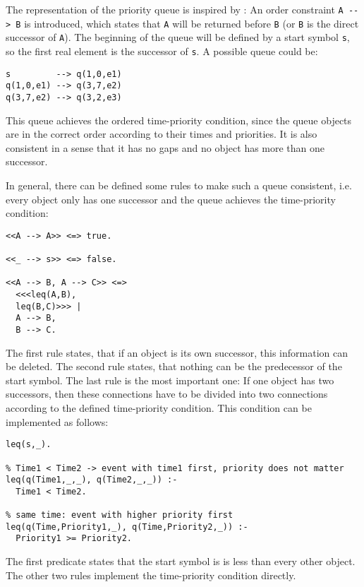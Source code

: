 The representation of the priority queue is inspired by \cite[38\psqq]{fru_chr_book_2009}: An order constraint \verb|A --> B| is introduced, which states that \verb|A| will be returned before \verb|B| (or \verb|B| is the direct successor of \verb|A|). The beginning of the queue will be defined by a start symbol \verb|s|, so the first real element is the successor of \verb|s|. A possible queue could be:

\begin{lstlisting}
s         --> q(1,0,e1)
q(1,0,e1) --> q(3,7,e2)
q(3,7,e2) --> q(3,2,e3)
\end{lstlisting}

This queue achieves the ordered time-priority condition, since the queue objects are in the correct order according to their times and priorities. It is also consistent in a sense that it has no gaps and no object has more than one successor.

In general, there can be defined some rules to make such a queue consistent, i.e. every object only has one successor and the queue achieves the time-priority condition:

\begin{lstlisting}
<<A --> A>> <=> true.

<<_ --> s>> <=> false.

<<A --> B, A --> C>> <=>
  <<<leq(A,B),
  leq(B,C)>>> |
  A --> B,
  B --> C.
\end{lstlisting}

The first rule states, that if an object is its own successor, this information can be deleted. The second rule states, that nothing can be the predecessor of the start symbol. The last rule is the most important one: If one object has two successors, then these connections have to be divided into two connections according to the defined time-priority condition. This condition can be implemented as follows:

\begin{lstlisting}
leq(s,_).

% Time1 < Time2 -> event with time1 first, priority does not matter
leq(q(Time1,_,_), q(Time2,_,_)) :- 
  Time1 < Time2.

% same time: event with higher priority first
leq(q(Time,Priority1,_), q(Time,Priority2,_)) :- 
  Priority1 >= Priority2.
\end{lstlisting}

The first predicate states that the start symbol is is less than every other object. The other two rules implement the time-priority condition directly.

